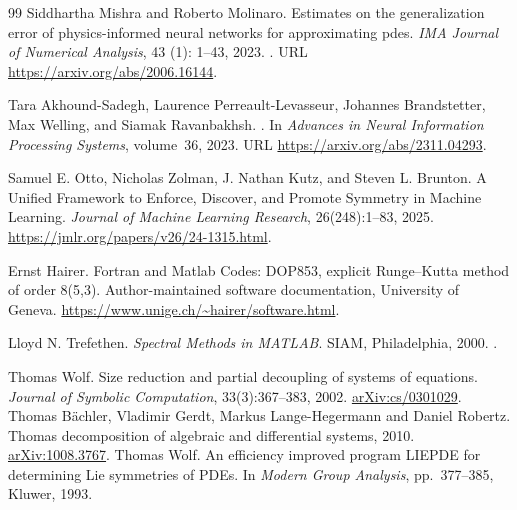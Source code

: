 \documentclass[11pt,a4paper,oneside]{report}
\numberwithin{equation}{chapter}
\begin{document}
\begin{thebibliography}{99}
Siddhartha Mishra and Roberto Molinaro.
\newblock Estimates on the generalization error of physics-informed neural
  networks for approximating pdes.
\newblock \emph{IMA Journal of Numerical Analysis}, 43 (1):
  1--43, 2023.
\newblock {}.
\newblock URL \url{https://arxiv.org/abs/2006.16144}.

Tara Akhound-Sadegh, Laurence Perreault-Levasseur, Johannes Brandstetter, Max
  Welling, and Siamak Ravanbakhsh.
.
\newblock In \emph{Advances in Neural Information Processing Systems},
  volume~36, 2023.
\newblock URL \url{https://arxiv.org/abs/2311.04293}.

Samuel E. Otto, Nicholas Zolman, J. Nathan Kutz, and Steven L. Brunton.
\newblock A Unified Framework to Enforce, Discover, and Promote Symmetry in Machine Learning.
\newblock \emph{Journal of Machine Learning Research}, 26(248):1--83, 2025.
\newblock \url{https://jmlr.org/papers/v26/24-1315.html}.

Ernst Hairer.
\newblock Fortran and Matlab Codes: DOP853, explicit Runge--Kutta method of order 8(5,3).
\newblock Author-maintained software documentation, University of Geneva.
\newblock \url{https://www.unige.ch/~hairer/software.html}.

Lloyd N. Trefethen.
\newblock \emph{Spectral Methods in MATLAB}.
\newblock SIAM, Philadelphia, 2000.
\newblock {}.

 Thomas Wolf. Size reduction and partial decoupling of systems of equations. \emph{Journal of Symbolic Computation}, 33(3):367--383, 2002. \href{https://arxiv.org/abs/cs/0301029}{arXiv:cs/0301029}.
 Thomas B\"achler, Vladimir Gerdt, Markus Lange-Hegermann and Daniel Robertz. Thomas decomposition of algebraic and differential systems, 2010. \href{https://arxiv.org/abs/1008.3767}{arXiv:1008.3767}.
 Thomas Wolf. An efficiency improved program LIEPDE for determining Lie symmetries of PDEs. In \emph{Modern Group Analysis}, pp.\ 377--385, Kluwer, 1993.

\end{thebibliography}
\endgroup
\end{document}
